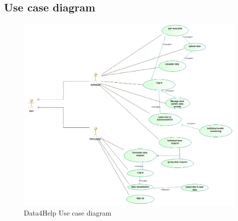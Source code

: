 \subsection{Use case diagram}
\begin{figure}[H]
  \includegraphics[width=1\linewidth]{resources/UML/GeneralUseCase.png}
  \caption{Data4Help Use case diagram}
  \label{fig:Use case diagram}
\end{figure}

